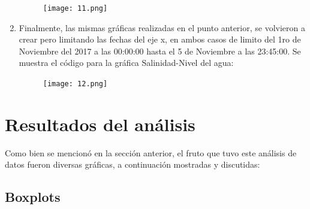 \documentclass[12pt]{article}
\begin{document}
\begin{enumerate}
\clearpage
\begin{figure}[h!]
  \texttt{[image: 11.png]}
  \centering
  \label{fig:11}
\end{figure}
\item Finalmente, las mismas gráficas realizadas en el punto anterior, se volvieron a crear pero limitando las fechas del eje x, en ambos casos de limito del 1ro de Noviembre del 2017 a las 00:00:00 hasta el 5 de Noviembre a las 23:45:00.  Se muestra el código para la gráfica Salinidad-Nivel del agua:
\begin{figure}[h!]
  \texttt{[image: 12.png]}
  \centering
  \label{fig:12}
\end{figure}
\end{enumerate}

\clearpage
\section{Resultados del análisis}

Como bien se mencionó en la sección anterior, el fruto que tuvo este análisis de datos fueron diversas gráficas, a continuación mostradas y discutidas: 
\subsection{Boxplots}
\end{document}
